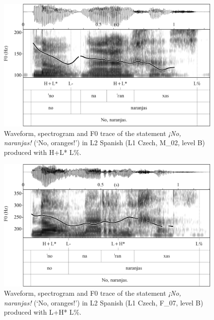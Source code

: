 \begin{figure}


\includegraphics[width=\textwidth]{figures/Figure_4.39.png}


\caption{Waveform, spectrogram and F0 trace of the statement \textit{¡No, naranjas!} (‘No, oranges!’) in L2 Spanish (L1 Czech, M\_02, level B) produced with H+L* L\%.}
\label{fig:4.39}
\end{figure}

\begin{figure}


\includegraphics[width=\textwidth]{figures/Figure_4.40.png}


\caption{Waveform, spectrogram and F0 trace of the statement \textit{¡No, naranjas!} (‘No, oranges!’) in L2 Spanish (L1 Czech, F\_07, level B) produced with L+H* L\%.}
\label{fig:4.40}
\end{figure}

